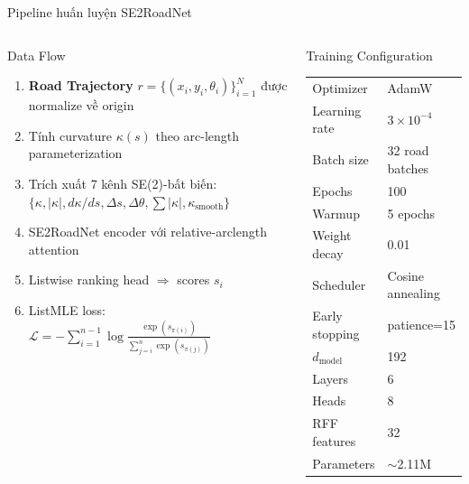 \documentclass[aspectratio=169,10pt]{beamer}
\begin{document}
\begin{frame}{Pipeline huấn luyện SE2RoadNet}
\begin{columns}[T]
\begin{block}{Data Flow}
\scriptsize
\begin{enumerate}
  \item \textbf{Road Trajectory} $r = \{(x_i, y_i, \theta_i)\}_{i=1}^{N}$ được normalize về origin
  \item Tính curvature $\kappa(s)$ theo arc-length parameterization
  \item Trích xuất 7 kênh SE(2)-bất biến: $\{\kappa, |\kappa|, d\kappa/ds, \Delta s, \Delta\theta, \sum|\kappa|, \kappa_{\text{smooth}}\}$
  \item SE2RoadNet encoder với relative-arclength attention
  \item Listwise ranking head $\Rightarrow$ scores $s_i$
  \item ListMLE loss: $\mathcal{L} = -\sum_{i=1}^{n-1} \log \frac{\exp(s_{\pi(i)})}{\sum_{j=i}^{n} \exp(s_{\pi(j)})}$
\end{enumerate}
\end{block}

\begin{block}{Training Configuration}
\scriptsize
\begin{tabular}{ll}
  Optimizer & AdamW \\
  Learning rate & $3 \times 10^{-4}$ \\
  Batch size & 32 road batches \\
  Epochs & 100 \\
  Warmup & 5 epochs \\
  Weight decay & 0.01 \\
  Scheduler & Cosine annealing \\
  Early stopping & patience=15 \\
  \midrule
  $d_{\text{model}}$ & 192 \\
  Layers & 6 \\
  Heads & 8 \\
  RFF features & 32 \\
  \midrule
  Parameters & $\sim$2.11M
\end{tabular}
\end{block}
\end{columns}
\end{frame}
\end{document}

